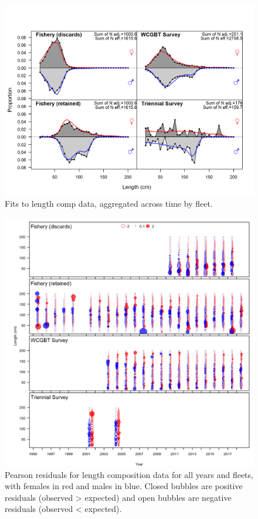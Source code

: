 \documentclass[12pt,]{article}
\begin{document}
\begin{figure}
\centering
\includegraphics{r4ss/plots_mod1/comp_lenfit__aggregated_across_time.png}
\caption{Fits to length comp data, aggregated across time by fleet.
\label{fig:comp_lenfit_aggregated_across_time}}
\end{figure}

\begin{figure}
\centering
\includegraphics{r4ss/plots_mod1/comp_lenfit__multi-fleet_comparison.png}
\caption{Pearson residuals for length composition data for all years and
fleets, with females in red and males in blue. Closed bubbles are
positive residuals (observed \textgreater{} expected) and open bubbles
are negative residuals (observed \textless{} expected).
\label{fig:comp_lenfit__multi-fleet_comparison}}
\end{figure}
\end{document}
